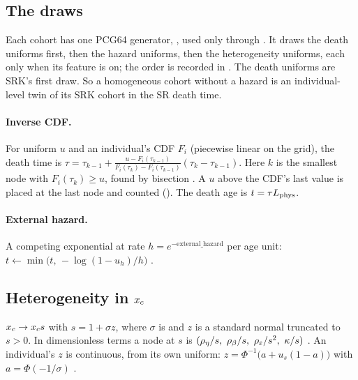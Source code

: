 \subsection{The draws}\label{sec:gen-draws}

Each cohort has one PCG64 generator, , used only through 
. It draws the death uniforms first, then the hazard uniforms, then the heterogeneity
uniforms, each only when its feature is on; the order is recorded in . The death uniforms are SRK's
first draw. So a homogeneous cohort without a hazard is an individual-level twin of its SRK cohort in the SR death
time.

\paragraph{Inverse CDF.} For uniform $u$ and an individual's CDF $F_i$ (piecewise linear on the grid), the death
time is $\tau=\tau_{k-1}+\frac{u-F_i(\tau_{k-1})}{F_i(\tau_k)-F_i(\tau_{k-1})}(\tau_k-\tau_{k-1})$. Here $k$ is the
smallest node with $F_i(\tau_k)\ge u$, found by bisection . A $u$ above the CDF's last
value is placed at the last node and counted (). The death age is $t=\tau L_{\rm phys}$.

\paragraph{External hazard.} A competing exponential at rate $h=e^{-\text{external\_hazard}}$ per age unit:
$t\leftarrow\min\bigl(t,\,-\log(1-u_h)/h\bigr)$ .

\subsection{Heterogeneity in $x_c$}\label{sec:gen-het}

$x_c\to x_c s$ with $s=1+\sigma z$, where $\sigma$ is  and $z$ is a standard normal truncated to
$s>0$. In dimensionless terms a node at $s$ is $(\rho_\eta/s,\ \rho_\beta/s,\ \rho_\eps/s^2,\ \kappa/s)$
. An individual's $z$ is continuous, from its own uniform:
$z=\Phi^{-1}\bigl(a+u_s(1-a)\bigr)$ with $a=\Phi(-1/\sigma)$ .


